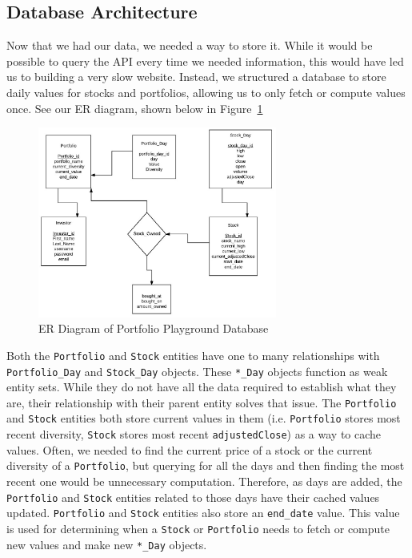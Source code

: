 \documentclass{article}
\begin{document}
\subsection{Database Architecture}
Now that we had our data, we needed a way to store it.  While it would be possible to query the API every time we needed information, this would have led us to building a very slow website.  Instead, we structured a database to store daily values for stocks and portfolios, allowing us to only fetch or compute values once.  See our ER diagram, shown below in Figure~\ref{fig:db_diagram}

\begin{figure}[H]
\begin{center}
\includegraphics[width=0.7\textwidth]{db_diagram}
\caption{\label{fig:db_diagram} ER Diagram of Portfolio Playground Database}
\end{center}
\end{figure}

Both the \texttt{Portfolio} and \texttt{Stock} entities have one to many relationships with \texttt{Portfolio\_Day} and \texttt{Stock\_Day} objects. These \texttt{*\_Day} objects function as weak entity sets. While they do not have all the data required to establish what they are, their relationship with their parent entity solves that issue. The \texttt{Portfolio} and \texttt{Stock} entities both store current values in them (i.e. \texttt{Portfolio} stores most recent diversity, \texttt{Stock} stores most recent \texttt{adjustedClose}) as a way to cache values. Often, we needed to find the current price of a stock or the current diversity of a \texttt{Portfolio}, but querying for all the days and then finding the most recent one would be unnecessary computation. Therefore, as days are added, the \texttt{Portfolio} and \texttt{Stock} entities related to those days have their cached values updated.  \texttt{Portfolio} and \texttt{Stock} entities also store an \texttt{end\_date} value.  This value is used for determining when a \texttt{Stock} or \texttt{Portfolio} needs to fetch or compute new values and make new \texttt{*\_Day} objects.  
\end{document}
